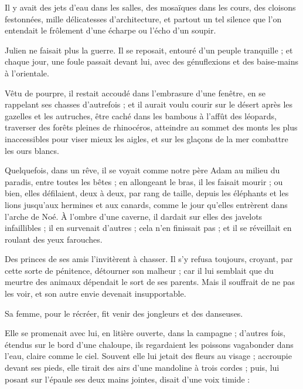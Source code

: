 \documentclass[]{book}
\begin{document}
                Il y avait des jets d'eau dans les salles, des mosaïques dans les cours, des cloisons festonnées, mille délicatesses d'architecture, et partout un tel silence que l'on entendait le frôlement d'une écharpe ou l'écho d'un soupir.
                    
                Julien ne faisait plus la guerre. Il se reposait, entouré d'un peuple tranquille ; et chaque jour, une foule passait devant lui, avec des génuflexions et des baise-mains à l'orientale.
                    
                Vêtu de pourpre, il restait accoudé dans l'embrasure d'une fenêtre, en se rappelant ses chasses d'autrefois ; et il aurait voulu courir sur le désert après les gazelles et les autruches, être caché dans les bambous à l'affût des léopards, traverser des forêts pleines de rhinocéros, atteindre au sommet des monts les plus inaccessibles pour viser mieux les aigles, et sur les glaçons de la mer combattre les ours blancs.
                    
                Quelquefois, dans un rêve, il se voyait comme notre père Adam au milieu du paradis, entre toutes les bêtes ; en allongeant le bras, il les faisait mourir ; ou bien, elles défilaient, deux à deux, par rang de taille, depuis les éléphants et les lions jusqu'aux hermines et aux canards, comme le jour qu'elles entrèrent dans l'arche de Noé. À l'ombre d'une caverne, il dardait sur elles des javelots infaillibles ; il en survenait d'autres ; cela n'en finissait pas ; et il se réveillait en roulant des yeux farouches.
                    
                Des princes de ses amis l'invitèrent à chasser. Il s'y refusa toujours, croyant, par cette sorte de pénitence, détourner son malheur ; car il lui semblait que du meurtre des animaux dépendait le sort de ses parents. Mais il souffrait de ne pas les voir, et son autre envie devenait insupportable.
                    
                Sa femme, pour le récréer, fit venir des jongleurs et des danseuses.
                    
                Elle se promenait avec lui, en litière ouverte, dans la campagne ; d'autres fois, étendus sur le bord d'une chaloupe, ils regardaient les poissons vagabonder dans l'eau, claire comme le ciel. Souvent elle lui jetait des fleurs au visage ; accroupie devant ses pieds, elle tirait des airs d'une mandoline à trois cordes ; puis, lui posant sur l'épaule ses deux mains jointes, disait d'une voix timide :
                    
\end{document}
